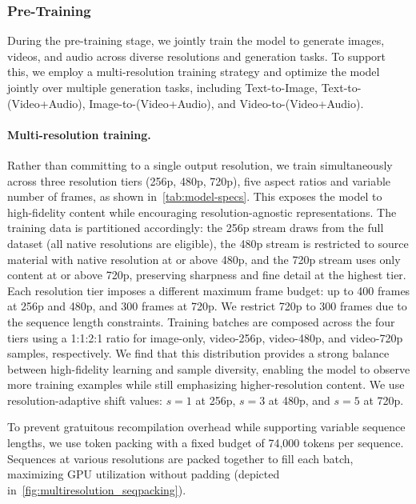 \subsubsection{Pre-Training}

During the pre-training stage, we jointly train the model to generate images, videos, and audio across diverse resolutions and generation tasks. To support this, we employ a multi-resolution training strategy and optimize the model jointly over multiple generation tasks, including Text-to-Image, Text-to-(Video+Audio), Image-to-(Video+Audio), and Video-to-(Video+Audio).

\paragraph{Multi-resolution training.}
Rather than committing to a single output resolution, we train simultaneously across three resolution tiers (256p, 480p, 720p), five aspect ratios and variable number of frames, as shown in~\cref{tab:model-specs}. This exposes the model to high-fidelity content while encouraging resolution-agnostic representations. The training data is partitioned accordingly: the 256p stream draws from the full dataset (all native resolutions are eligible), the 480p stream is restricted to source material with native resolution at or above 480p, and the 720p stream uses only content at or above 720p, preserving sharpness and fine detail at the highest tier. Each resolution tier imposes a different maximum frame budget: up to 400 frames at 256p and 480p, and 300 frames at 720p. We restrict 720p to 300 frames due to the sequence length constraints. Training batches are composed across the four tiers using a 1:1:2:1 ratio for image-only, video-256p, video-480p, and video-720p samples, respectively. We find that this distribution provides a strong balance between high-fidelity learning and sample diversity, enabling the model to observe more training examples while still emphasizing higher-resolution content.
We use resolution-adaptive shift values: $s=1$ at 256p, $s=3$ at 480p, and $s=5$ at 720p.


To prevent gratuitous recompilation overhead while supporting variable sequence lengths, we use token packing with a fixed budget of 74,000 tokens per sequence. Sequences at various resolutions are packed together to fill each batch, maximizing GPU utilization without padding (depicted in~\cref{fig:multiresolution_seqpacking}). 

